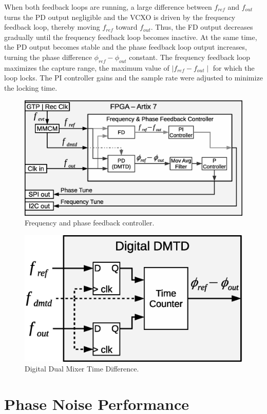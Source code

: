 \documentclass[a4paper,
               biblatex,      %
               ]{jacow}
\begin{document}
When both feedback loops are running, a large difference between $f_{ref}$ and $f_{out}$ turns the PD output negligible and the VCXO is driven by the frequency feedback loop, thereby moving $f_{ref}$ toward $f_{out}$. Thus, the FD output decreases gradually until the frequency feedback loop becomes inactive. At the same time, the PD output becomes stable and the phase feedback loop output increases, turning the phase difference $\phi_{ref}-\phi_{out}$ constant. The frequency feedback loop maximizes the capture range, the maximum value of ${\mid f_{ref}-f_{out} \mid}$ for which the loop locks. The PI controller gains and the sample rate were adjusted to minimize the locking time.

\begin{figure}[!htb]
   \centering
   \includegraphics*[width=0.9\columnwidth]{AFCFPGADMTD}
   \caption{Frequency and phase feedback controller.}
   \label{fig:AFCFPGADMTD}
\end{figure}

\begin{figure}[!htb]
   \centering
   \includegraphics*[width=0.8\columnwidth]{DigitalDMTD}
   \caption{Digital Dual Mixer Time Difference.}
   \label{fig:DigitalDMTD}
\end{figure}

\section{Phase Noise Performance}
\end{document}
